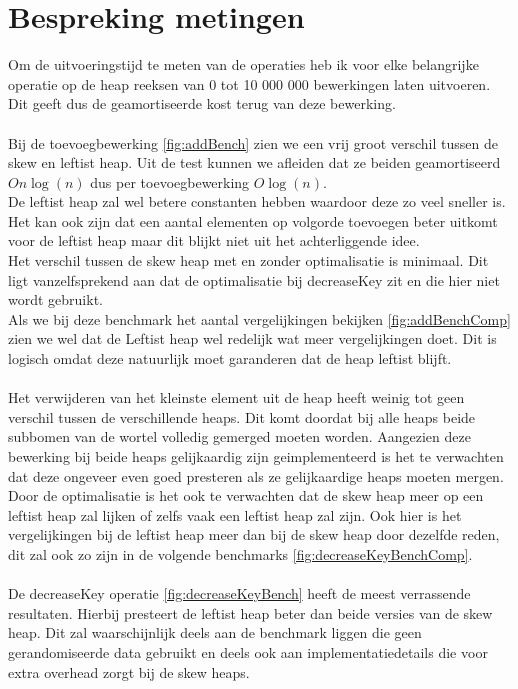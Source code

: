 \documentclass[10pt,a4paper,twoside]{article}
\begin{document}
\section{Bespreking metingen}
Om de uitvoeringstijd te meten van de operaties heb ik voor elke belangrijke operatie op de heap reeksen van 0 tot 10 000 000 bewerkingen laten uitvoeren. Dit geeft dus de geamortiseerde kost terug van deze bewerking.
\\\\
Bij de toevoegbewerking \ref{fig:addBench} zien we een vrij groot verschil tussen de skew en leftist heap. Uit de test kunnen we afleiden dat ze beiden geamortiseerd $O n\log(n)$ dus per toevoegbewerking $O \log(n)$.\\
De leftist heap zal wel betere constanten hebben waardoor deze zo veel sneller is. Het kan ook zijn dat een aantal elementen op volgorde toevoegen beter uitkomt voor de leftist heap maar dit blijkt niet uit het achterliggende idee.\\
Het verschil tussen de skew heap met en zonder optimalisatie is minimaal. Dit ligt vanzelfsprekend aan dat de optimalisatie bij {\selectfont decreaseKey} zit en die hier niet wordt gebruikt.\\
Als we bij deze benchmark het aantal vergelijkingen bekijken \ref{fig:addBenchComp} zien we wel dat de Leftist heap wel redelijk wat meer vergelijkingen doet. Dit is logisch omdat deze natuurlijk moet garanderen dat de heap leftist blijft.
\\\\
Het verwijderen van het kleinste element uit de heap heeft weinig tot geen verschil tussen de verschillende heaps. Dit komt doordat bij alle heaps beide subbomen van de wortel volledig gemerged moeten worden. Aangezien deze bewerking bij beide heaps gelijkaardig zijn geimplementeerd is het te verwachten dat deze ongeveer even goed presteren als ze gelijkaardige heaps moeten mergen.\\
Door de optimalisatie is het ook te verwachten dat de skew heap meer op een leftist heap zal lijken of zelfs vaak een leftist heap zal zijn. Ook hier is het vergelijkingen bij de leftist heap meer dan bij de skew heap door dezelfde reden, dit zal ook zo zijn in de volgende benchmarks \ref{fig:decreaseKeyBenchComp}.
\\\\
De {\selectfont decreaseKey} operatie \ref{fig:decreaseKeyBench} heeft de meest verrassende resultaten. Hierbij presteert de leftist heap beter dan beide versies van de skew heap. Dit zal waarschijnlijk deels aan de benchmark liggen die geen gerandomiseerde data gebruikt en deels ook aan implementatiedetails die voor extra overhead zorgt bij de skew heaps.\\
\end{document}
